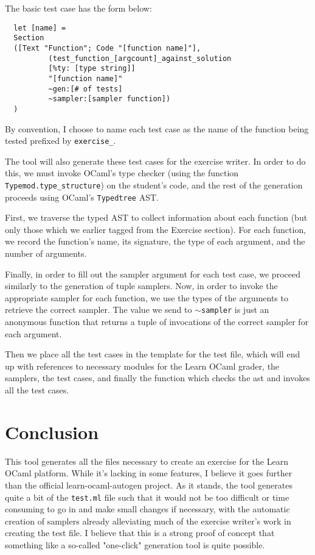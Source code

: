 \documentclass[11pt]{article}
\begin{document}
The basic test case has the form below:

\begin{lstlisting}
  let [name] =
  Section
  ([Text "Function"; Code "[function name]"],
          (test_function_[argcount]_against_solution
          [%ty: [type string]]
          "[function name]"
          ~gen:[# of tests]
          ~sampler:[sampler function])
  )
\end{lstlisting}

By convention, I choose to name each test case as the name of the function being tested prefixed by \verb+exercise_+. 

The tool will also generate these test cases for the exercise writer. In order to do this, we must invoke OCaml's type checker (using the function \verb+Typemod.type_structure+) on the student's code, and the rest of the generation proceeds using OCaml's \verb+Typedtree+ AST.

First, we traverse the typed AST to collect information about each function (but only those which we earlier tagged from the Exercise section). For each function, we record the function's name, its signature, the type of each argument, and the number of arguments.

Finally, in order to fill out the sampler argument for each test case, we proceed similarly to the generation of tuple samplers. Now, in order to invoke the appropriate sampler for each function, we use the types of the arguments to retrieve the correct sampler. The value we send to $\sim$\verb+sampler+ is just an anonymous function that returns a tuple of invocations of the correct sampler for each argument.

Then we place all the test cases in the template for the test file, which will end up with references to necessary modules for the Learn OCaml grader, the samplers, the test cases, and finally the function which checks the ast and invokes all the test cases.

\section{Conclusion}
This tool generates all the files necessary to create an exercise for the Learn OCaml platform. While it's lacking in some features, I believe it goes further than the official learn-ocaml-autogen project. As it stands, the tool generates quite a bit of the \verb+test.ml+ file such that it would not be too difficult or time consuming to go in and make small changes if necessary, with the automatic creation of samplers already alleviating much of the exercise writer's work in creating the test file. I believe that this is a strong proof of concept that something like a so-called "one-click" generation tool is quite possible.
\end{document}
